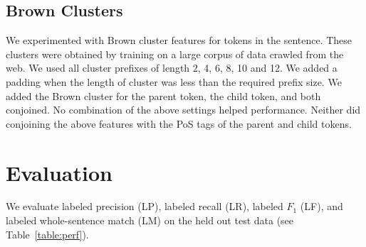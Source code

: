 \documentclass[11pt]{article}
\begin{document}
\subsection{Brown Clusters}
We experimented with Brown cluster features \cite{Brown:1992:CNG:176313.176316}
for tokens in the sentence.
These clusters were obtained by training on a large corpus of data crawled from
the web.
We used all cluster prefixes of length 2, 4, 6, 8, 10 and 12.
We added a padding when the length of cluster was less than the required prefix
size.
We added the Brown cluster for the parent token, the child token, and both
conjoined.
No combination of the above settings helped performance.
Neither did conjoining the above features with the PoS tags of the parent and
child tokens.



\section{Evaluation}
\label{s:evaluation}

We evaluate labeled precision (LP), labeled recall (LR), labeled $F_1$ (LF), and
labeled whole-sentence match (LM) on the held out test data (see
Table~\ref{table:perf}).

% 
% 
% 
% 

% 
% 
\end{document}
